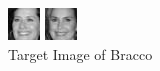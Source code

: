 \documentclass[12pt]{article} %
\begin{document}
\begin{figure}[H] %
  \centering 
  \begin{minipage}[b]{0.2\textwidth}
    \includegraphics[width=\textwidth]{part3_3_3_correct_bracco}
    \caption{Target Image of Bracco}
  \end{minipage}
  \begin{minipage}[b]{0.1\textwidth}
    \includegraphics[width=\textwidth]{part3_3_3_error1_gilpin}

\end{minipage}
\end{figure}
\end{document}
